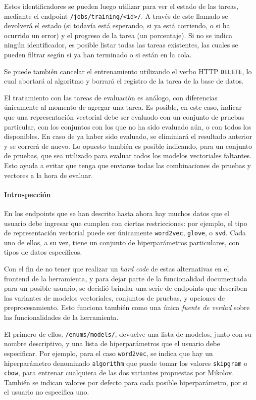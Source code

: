 Estos identificadores se pueden luego utilizar para ver el estado de las tareas, mediante el
endpoint \texttt{/jobs/training/<id>/}. A través de este llamado se devolverá el estado (si todavía
está esperando, si ya está corriendo, o si ha ocurrido un error) y el progreso de la tarea (un
porcentaje). Si no se indica ningún identificador, es posible listar todas las tareas existentes,
las cuales se pueden filtrar según si ya han terminado o si están en la cola.

Se puede también cancelar el entrenamiento utilizando el verbo HTTP \texttt{DELETE}, lo cual
abortará al algoritmo y borrará el registro de la tarea de la base de datos.

El tratamiento con las tareas de evaluación es análogo, con diferencias únicamente al momento de
agregar una tarea. Es posible, en este caso, indicar que una representación vectorial debe ser
evaluado con un conjunto de pruebas particular, con los conjuntos con los que no ha sido evaluado
aún, o con todos los disponibles. En caso de ya haber sido evaluado, se eliminiará el resultado
anterior y se correrá de nuevo. Lo opuesto también es posible indicando, para un conjunto de
pruebas, que sea utilizado para evaluar todos los modelos vectoriales faltantes. Esto ayuda a evitar
que tenga que enviarse todas las combinaciones de pruebas y vectores a la hora de evaluar.


\paragraph{Introspección}

En los endpoints que se han descrito hasta ahora hay muchos datos que el usuario debe ingresar que
cumplen con ciertas restricciones: por ejemplo, el tipo de representación vectorial puede ser
únicamente \texttt{word2vec}, \texttt{glove}, o \texttt{svd}. Cada uno de ellos, a su vez, tiene un
conjunto de hiperparámetros particulares, con tipos de datos específicos.

Con el fin de no tener que realizar un \textit{hard code} de estas alternativas en el frontend de la
herramienta, y para dejar parte de la funcionalidad documentada para un posible usuario, se decidió
brindar una serie de endpoints que describen las variantes de modelos vectoriales, conjuntos de
pruebas, y opciones de preprocesamiento. Esto funciona también como una única \textit{fuente de
verdad} sobre las funcionalidades de la herramienta.

El primero de ellos, \texttt{/enums/models/}, devuelve una lista de modelos, junto con su nombre
descriptivo, y una lista de hiperparámetros que el usuario debe especificar. Por ejemplo, para el
caso \texttt{word2vec}, se indica que hay un hiperparámetro denominado \texttt{algorithm} que puede
tomar los valores \texttt{skipgram} o \texttt{cbow}, para entrenar cualquiera de las dos variantes
propuestas por Mikolov. También se indican valores por defecto para cada posible hiperparámetro, por
si el usuario no especifica uno.

